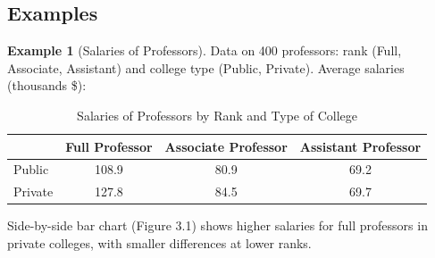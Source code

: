 \documentclass{article}
\theoremstyle{definition}
\newtheorem{example}{Example}
\begin{document}
	\subsection{Examples}
	\begin{example}[Salaries of Professors]
		Data on 400 professors: rank (Full, Associate, Assistant) and college type (Public, Private). Average salaries (thousands \$):
	\end{example}	
		\begin{table}[ht]
			\centering
			\begin{tabular}{lccc}
				\toprule
				& Full Professor & Associate Professor & Assistant Professor \\
				\midrule
				Public & 108.9 & 80.9 & 69.2 \\
				Private & 127.8 & 84.5 & 69.7 \\
				\bottomrule
			\end{tabular}
			\caption{Salaries of Professors by Rank and Type of College}
		\end{table}
		Side-by-side bar chart (Figure 3.1) shows higher salaries for full professors in private colleges, with smaller differences at lower ranks.
\end{document}
